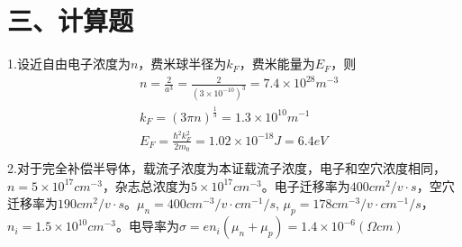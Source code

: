 \documentclass[UTF8]{ctexart}
\begin{document}
\section*{三、计算题}
1.设近自由电子浓度为$n$，费米球半径为$k_F$，费米能量为$E_F$，则
\begin{equation*}
    \begin{aligned}
        &n=\frac{2}{a^3}=\frac{2}{(3\times10^{-10})^3}=7.4\times10^{28}m^{-3}\\
        &k_F=(3\pi n)^{\frac{1}{3}}=1.3\times10^{10}m^{-1}\\
        &E_F=\frac{\hbar^2k_F^2}{2m_0}=1.02\times10^{-18}J=6.4eV\\
    \end{aligned}
\end{equation*}
2.对于完全补偿半导体，载流子浓度为本证载流子浓度，电子和空穴浓度相同，$n=5\times10^{17}cm^{-3}$，杂志总浓度为$5\times10^{17}
cm^{-3}$。电子迁移率为$400cm^2/v\cdot s$，空穴迁移率为$190cm^2/v\cdot s$。$\mu_n=400cm^{-3}/v\cdot cm^{-1}/s$,
$\mu_p=178cm^{-3}/v\cdot cm^{-1}/s$，$n_i=1.5\times10^{10}cm^{-3}$。电导率为$\sigma=en_i(\mu_n+\mu_p)=1.4\times10^{-6}
(\Omega cm)$
\end{document}
